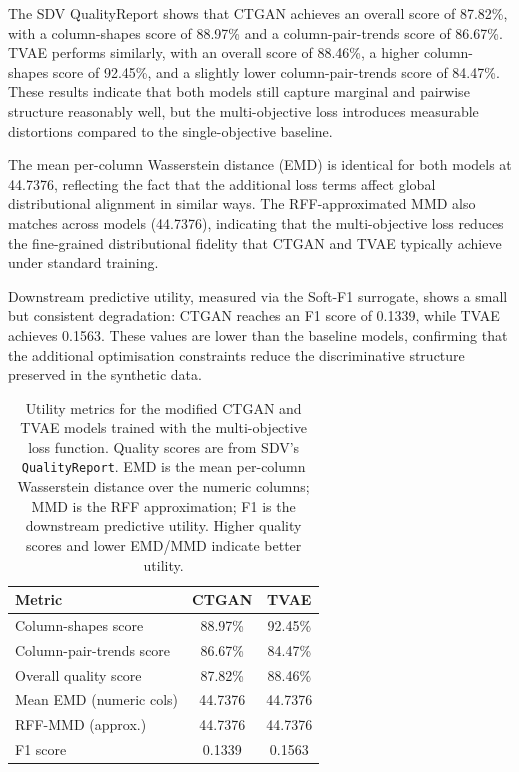 \documentclass[11pt]{article}
\begin{document}
The SDV QualityReport shows that CTGAN achieves an overall score of 87.82\%, with a column-shapes score of 88.97\% and a column-pair-trends score of 86.67\%. TVAE performs similarly, with an overall score of 88.46\%, a higher column-shapes score of 92.45\%, and a slightly lower column-pair-trends score of 84.47\%. These results indicate that both models still capture marginal and pairwise structure reasonably well, but the multi-objective loss introduces measurable distortions compared to the single-objective baseline.

The mean per-column Wasserstein distance (EMD) is identical for both models at 44.7376, reflecting the fact that the additional loss terms affect global distributional alignment in similar ways. The RFF-approximated MMD also matches across models (44.7376), indicating that the multi-objective loss reduces the fine-grained distributional fidelity that CTGAN and TVAE typically achieve under standard training.

Downstream predictive utility, measured via the Soft-F1 surrogate, shows a small but consistent degradation: CTGAN reaches an F1 score of 0.1339, while TVAE achieves 0.1563. These values are lower than the baseline models, confirming that the additional optimisation constraints reduce the discriminative structure preserved in the synthetic data.

\begin{table}[h]
\centering
\caption{Utility metrics for the modified CTGAN and TVAE models trained with the multi-objective loss function. Quality scores are from SDV’s \texttt{QualityReport}. EMD is the mean per-column Wasserstein distance over the numeric columns; MMD is the RFF approximation; F1 is the downstream predictive utility. Higher quality scores and lower EMD/MMD indicate better utility.}
\begin{tabular}{lcc}
\toprule
\textbf{Metric} & \textbf{CTGAN} & \textbf{TVAE} \\
\midrule
Column-shapes score & 88.97\% & 92.45\% \\
Column-pair-trends score & 86.67\% & 84.47\% \\
Overall quality score & 87.82\% & 88.46\% \\
Mean EMD (numeric cols) & 44.7376 & 44.7376 \\
RFF-MMD (approx.) & 44.7376 & 44.7376 \\
F1 score & 0.1339 & 0.1563 \\
\bottomrule
\end{tabular}
\end{table}
\end{document}
